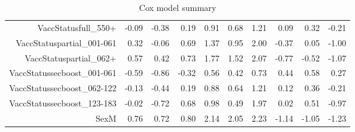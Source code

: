\begin{table}[ht]
\begin{tabular}{rrrrrrrrrr}
  VaccStatusfull\_550+ & -0.09 & -0.38 & 0.19 & 0.91 & 0.68 & 1.21 & 0.09 & 0.32 & -0.21 \\ 
  VaccStatuspartial\_001-061 & 0.32 & -0.06 & 0.69 & 1.37 & 0.95 & 2.00 & -0.37 & 0.05 & -1.00 \\ 
  VaccStatuspartial\_062+ & 0.57 & 0.42 & 0.73 & 1.77 & 1.52 & 2.07 & -0.77 & -0.52 & -1.07 \\ 
  VaccStatussecboost\_001-061 & -0.59 & -0.86 & -0.32 & 0.56 & 0.42 & 0.73 & 0.44 & 0.58 & 0.27 \\ 
  VaccStatussecboost\_062-122 & -0.13 & -0.44 & 0.19 & 0.88 & 0.64 & 1.21 & 0.12 & 0.36 & -0.21 \\ 
  VaccStatussecboost\_123-183 & -0.02 & -0.72 & 0.68 & 0.98 & 0.49 & 1.97 & 0.02 & 0.51 & -0.97 \\ 
  SexM & 0.76 & 0.72 & 0.80 & 2.14 & 2.05 & 2.23 & -1.14 & -1.05 & -1.23 \\ 
   \hline
\end{tabular}
\caption{Cox model summary} 
\end{table}
